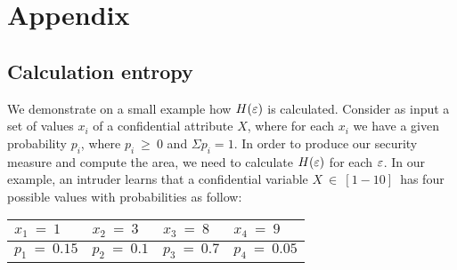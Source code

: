 \documentclass{llncs}
\begin{document}
\clearpage
\section*{Appendix}
\subsection*{Calculation entropy}
We demonstrate on a small example how  $H(\huge{\varepsilon})$ is calculated. Consider as input a set of values $x_{i}$ of a confidential attribute $X$, where for each $x_{i}$ we have a given probability $p_{i}$, where $p_{i}~\geq~0$ and $\Sigma p_{i}=1$. In order to produce our security measure and compute the area, we need to calculate $H(\huge{\varepsilon})$ for each $\huge{\varepsilon}$. In our example, an intruder learns that a confidential variable $X~\in~[1-10]$~has four possible values with probabilities as follow:

\begin{table}[h]
\begin{center}
\begin{tabular}{| l | l | l | l |}
\hline $x_{1}~=~1$      & $x_{2}~=~3$      & $x_{3}~=~8$      & $x_{4}~=~9$ \\
\hline $p_{1}~=~0.15$   & $p_{2}~=~0.1$    & $p_{3}~=~0.7$    & $p_{4}~=~0.05$  \\
\hline
\end{tabular}
 \label{table:NumericalExample}
\end{center}
\end{table}
\end{document}
